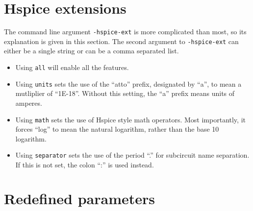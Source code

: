 \section{Hspice extensions}
\label{hspice_ext_cmd_line}

The command line argument \verb+-hspice-ext+ is more complicated than most, so its explanation is given in this section.
The second argument to \verb+-hspice-ext+ can either be a single string or can be a comma separated list.
\begin{itemize}
\item Using \verb+all+ will enable all the features.   
\item Using \verb+units+ sets the use of the ``atto'' prefix, designated by ``a'', to mean a mutliplier of ``1E-18''.   Without this setting, the ``a'' prefix means units of amperes.
\item Using \verb+math+ sets the use of Hspice style math operators.  Most importantly, it forces ``log'' to mean the natural logarithm, rather than the base 10 logarithm.
\item Using \verb+separator+ sets the use of the period ``.'' for subcircuit name separation.  If this is not set, the colon ``:'' is used instead.
\end{itemize}

\section{Redefined parameters}
\label{redefined_params_cmd_line}

